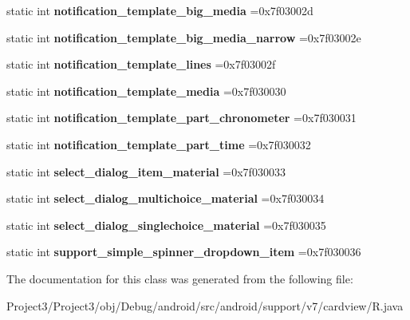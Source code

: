 \begin{DoxyCompactItemize}
static int {\bfseries notification\+\_\+template\+\_\+big\+\_\+media} =0x7f03002d
\item 
\mbox{\label{classandroid_1_1support_1_1v7_1_1cardview_1_1R_1_1layout_a693b4716a9ba54f67cd075b1bebc43f2}} 
static int {\bfseries notification\+\_\+template\+\_\+big\+\_\+media\+\_\+narrow} =0x7f03002e
\item 
\mbox{\label{classandroid_1_1support_1_1v7_1_1cardview_1_1R_1_1layout_ab074f9951fe0fa240aa522bd35965c4a}} 
static int {\bfseries notification\+\_\+template\+\_\+lines} =0x7f03002f
\item 
\mbox{\label{classandroid_1_1support_1_1v7_1_1cardview_1_1R_1_1layout_ad2a09702ec18235fbe32959099b7e558}} 
static int {\bfseries notification\+\_\+template\+\_\+media} =0x7f030030
\item 
\mbox{\label{classandroid_1_1support_1_1v7_1_1cardview_1_1R_1_1layout_ac1bc27f42996355d32a577ee31d49129}} 
static int {\bfseries notification\+\_\+template\+\_\+part\+\_\+chronometer} =0x7f030031
\item 
\mbox{\label{classandroid_1_1support_1_1v7_1_1cardview_1_1R_1_1layout_a20521d17131e51ba8c7b6da5c73f3541}} 
static int {\bfseries notification\+\_\+template\+\_\+part\+\_\+time} =0x7f030032
\item 
\mbox{\label{classandroid_1_1support_1_1v7_1_1cardview_1_1R_1_1layout_a8cbbdc4035459fc8a07b12b96d969637}} 
static int {\bfseries select\+\_\+dialog\+\_\+item\+\_\+material} =0x7f030033
\item 
\mbox{\label{classandroid_1_1support_1_1v7_1_1cardview_1_1R_1_1layout_af6f39773b58da693f5f64a4265528b4b}} 
static int {\bfseries select\+\_\+dialog\+\_\+multichoice\+\_\+material} =0x7f030034
\item 
\mbox{\label{classandroid_1_1support_1_1v7_1_1cardview_1_1R_1_1layout_a2fac25a995ed2ea66265291c2a886c3e}} 
static int {\bfseries select\+\_\+dialog\+\_\+singlechoice\+\_\+material} =0x7f030035
\item 
\mbox{\label{classandroid_1_1support_1_1v7_1_1cardview_1_1R_1_1layout_af396711c2820fbbf62bde6ec65f7f5bd}} 
static int {\bfseries support\+\_\+simple\+\_\+spinner\+\_\+dropdown\+\_\+item} =0x7f030036
\end{DoxyCompactItemize}


The documentation for this class was generated from the following file\+:\begin{DoxyCompactItemize}
\item 
Project3/\+Project3/obj/\+Debug/android/src/android/support/v7/cardview/R.\+java\end{DoxyCompactItemize}
